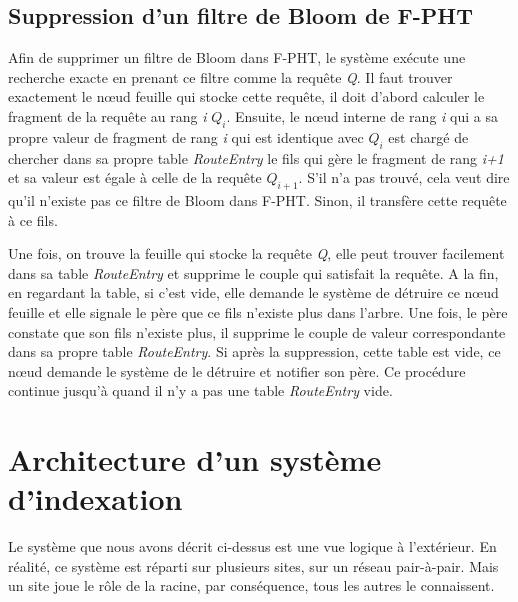 \documentclass[a4paper,11pt]{report}
\begin{document}
\section{Suppression d'un filtre de Bloom de F-PHT}
	Afin de supprimer un filtre de Bloom dans F-PHT, le système exécute une recherche exacte en prenant ce filtre comme la requête \textit{Q}. Il faut trouver exactement le nœud feuille qui stocke cette requête, il doit d'abord calculer le fragment de la requête au rang \textit{i} \textit{$Q_i$}. Ensuite, le nœud interne de rang \textit{i} qui a sa propre valeur de fragment de rang \textit{i} qui est identique avec \textit{$Q_i$} est chargé de chercher dans sa propre table \textit{RouteEntry} le fils qui gère le fragment de rang \textit{i+1} et sa valeur est égale à celle de la requête \textit{$Q_{i+1}$}. S'il n'a pas trouvé, cela veut dire qu'il n'existe pas ce filtre de Bloom dans F-PHT. Sinon, il transfère cette requête à ce fils.
	
	Une fois, on trouve la feuille qui stocke la requête \textit{Q}, elle peut trouver facilement dans sa table \textit{RouteEntry} et supprime le couple qui satisfait la requête. A la fin, en regardant la table, si c'est vide, elle demande le système de détruire ce nœud feuille et elle signale le père que ce fils n'existe plus dans l'arbre. Une fois, le père constate que son fils n'existe plus, il supprime le couple de valeur correspondante dans sa propre table \textit{RouteEntry}. Si après la suppression, cette table est vide, ce nœud demande le système de le détruire et notifier son père. Ce procédure continue jusqu'à quand il n'y a pas une table \textit{RouteEntry} vide.
	
\chapter{Architecture d'un système d'indexation}

	Le système que nous avons décrit ci-dessus est une vue logique à l'extérieur. En réalité, ce système est réparti sur plusieurs sites, sur un réseau pair-à-pair. Mais un site joue le rôle de la racine, par conséquence, tous les autres le connaissent.
	
	
\end{document}
